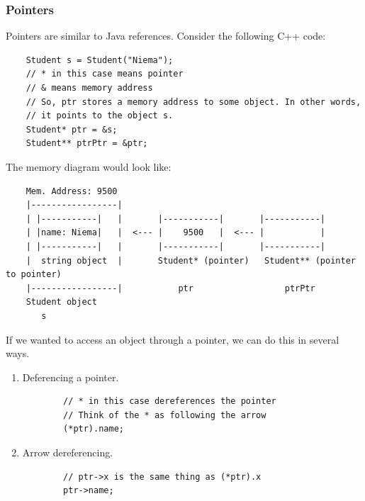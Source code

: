 \documentclass[letterpaper]{article}
\begin{document}
\subsubsection{Pointers}
Pointers are similar to Java references. Consider the following C++ code: 
\begin{verbatim}
    Student s = Student("Niema");
    // * in this case means pointer 
    // & means memory address
    // So, ptr stores a memory address to some object. In other words, 
    // it points to the object s. 
    Student* ptr = &s; 
    Student** ptrPtr = &ptr; 
\end{verbatim}
The memory diagram would look like: 
\begin{verbatim}
    Mem. Address: 9500 
    |-----------------|
    | |-----------|   |       |-----------|       |-----------|
    | |name: Niema|   |  <--- |    9500   |  <--- |           |
    | |-----------|   |       |-----------|       |-----------|
    |  string object  |       Student* (pointer)   Student** (pointer to pointer) 
    |-----------------|           ptr                  ptrPtr
    Student object      
       s
\end{verbatim} 
If we wanted to access an object through a pointer, we can do this in several ways. 
\begin{enumerate}
    \item Deferencing a pointer. 
    \begin{verbatim}
        // * in this case dereferences the pointer
        // Think of the * as following the arrow  
        (*ptr).name; 
    \end{verbatim}

    \item Arrow dereferencing. 
    \begin{verbatim}
        // ptr->x is the same thing as (*ptr).x
        ptr->name; 
    \end{verbatim}
\end{enumerate}
\end{document}
